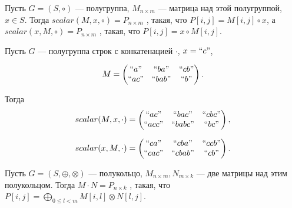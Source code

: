 \begin{definition}
Пусть $G = (S,\circ)$ --- полугруппа, $M_{n \times m}$ --- матрица над этой полугруппой, $x \in S$.
Тогда 
$
scalar(M,x,\circ) = P_{n \times m}
$ 
, такая, что $P[i,j] = M[i,j] \circ x$, а
$
scalar(x,M,\circ) = P_{n \times m}
$ 
, такая, что $P[i,j] = x \circ M[i,j]$.

\end{definition}

\begin{example}

Пусть $G$ --- полугруппа строк с конкатенацией $\cdot$, $x = ``c"$, 

$$
M = 
\begin{pmatrix}
``a"  & ``ba"  & ``cb" \\
``ac" & ``bab" & ``b"  \\
\end{pmatrix}.
$$

Тогда 
$$
scalar(M,x, \cdot) = 
\begin{pmatrix}
``ac"  & ``bac"  & ``cbc" \\
``acc" & ``babc" & ``bc"  \\
\end{pmatrix},
$$

$$
scalar(x, M, \cdot) = 
\begin{pmatrix}
``ca"  & ``cba"  & ``ccb" \\
``cac" & ``cbab" & ``cb"  \\
\end{pmatrix}.
$$

\end{example}


\begin{definition}\label{def:MxM}

Пусть $G = (S,\oplus, \otimes)$ --- полукольцо, $M_{n \times m}, N_{m\times k}$ --- две матрицы над этим полукольцом.
Тогда 
$
M\cdot N = P_{n \times k}
$ 
, такая, что $P[i,j] = \bigoplus_{0 \leq l < m} M[i,l] \otimes N[l,j]$.

\end{definition}

